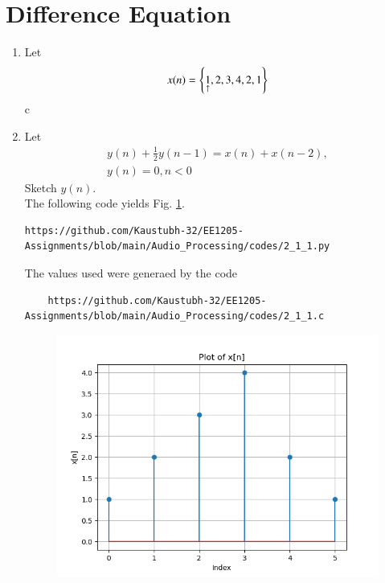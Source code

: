 \documentclass[journal,12pt,twocolumn]{IEEEtran}
\theoremstyle{remark}
\begin{document}
\section{Difference Equation}
\begin{enumerate}[label=\thesection.\arabic*,ref=\thesection.\theenumi]
\item Let
\begin{equation}
x(n) = \left\{\underset{\uparrow}{1},2,3,4,2,1\right\}
\end{equation}
c \item Let
\begin{multline}
\label{eq:iir_filter}
y(n) + \frac{1}{2}y(n-1) = x(n) + x(n-2), 
\\
 y(n) = 0, n < 0
\end{multline}
Sketch $y(n)$.
\\
\solution The following code yields Fig. \ref{fig:xnyn}.
\begin{lstlisting}
https://github.com/Kaustubh-32/EE1205-Assignments/blob/main/Audio_Processing/codes/2_1_1.py
\end{lstlisting}
The values used were generaed by the code
\begin{lstlisting}
    https://github.com/Kaustubh-32/EE1205-Assignments/blob/main/Audio_Processing/codes/2_1_1.c
\end{lstlisting}
\begin{figure}[!ht]
\begin{center}
\includegraphics[width=\columnwidth]{2_1_1.png}
\end{center}
\label{fig:xnyn}	
\end{figure}


\end{enumerate}
\end{document}
